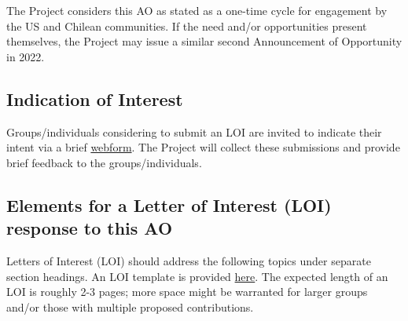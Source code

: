 \documentclass[SE,authoryear,toc]{lsstdoc}
\begin{document}
The Project considers this AO as stated as a one-time cycle for engagement by the US and Chilean communities. If the need and/or opportunities present themselves, the Project may issue a similar second Announcement of Opportunity in 2022. 

\subsection{Indication of Interest}

Groups/individuals considering to submit an LOI are invited to indicate their intent via a brief \href{https://forms.gle/fu5WsRgEYewbSvs76}{webform}. The Project will collect these submissions and provide brief feedback to the groups/individuals. 

\subsection{Elements for a Letter of Interest (LOI) response to this AO}

Letters of Interest (LOI) should address the following topics under separate section headings. An LOI template is provided \href{https://docs.google.com/document/d/12mYS3H0xRZme2t0leGIHfzwNgh575QhqsVnoUz7ybqQ/edit?usp=sharing}{here}. The expected length of an LOI is roughly 2-3 pages; more space might be warranted for larger groups and/or those with multiple proposed contributions. 
\end{document}
